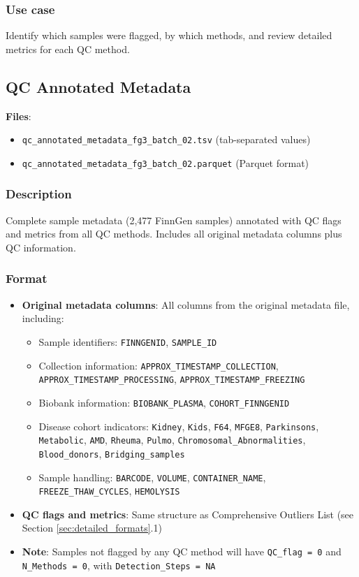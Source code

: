 \documentclass[11pt,a4paper]{article}
\begin{document}
\subsubsection{Use case}
Identify which samples were flagged, by which methods, and review detailed metrics for each QC method.

\subsection{QC Annotated Metadata}

\textbf{Files}:
\begin{itemize}
\item \texttt{qc\_annotated\_metadata\_fg3\_batch\_02.tsv} (tab-separated values)
\item \texttt{qc\_annotated\_metadata\_fg3\_batch\_02.parquet} (Parquet format)
\end{itemize}

\subsubsection{Description}
Complete sample metadata (2,477 FinnGen samples) annotated with QC flags and metrics from all QC methods. Includes all original metadata columns plus QC information.

\subsubsection{Format}
\begin{itemize}
\item \textbf{Original metadata columns}: All columns from the original metadata file, including:
  \begin{itemize}
    \item Sample identifiers: \texttt{FINNGENID}, \texttt{SAMPLE\_ID}
    \item Collection information: \texttt{APPROX\_TIMESTAMP\_COLLECTION}, \texttt{APPROX\_TIMESTAMP\_PROCESSING}, \texttt{APPROX\_TIMESTAMP\_FREEZING}
    \item Biobank information: \texttt{BIOBANK\_PLASMA}, \texttt{COHORT\_FINNGENID}
    \item Disease cohort indicators: \texttt{Kidney}, \texttt{Kids}, \texttt{F64}, \texttt{MFGE8}, \texttt{Parkinsons}, \texttt{Metabolic}, \texttt{AMD}, \texttt{Rheuma}, \texttt{Pulmo}, \texttt{Chromosomal\_Abnormalities}, \texttt{Blood\_donors}, \texttt{Bridging\_samples}
    \item Sample handling: \texttt{BARCODE}, \texttt{VOLUME}, \texttt{CONTAINER\_NAME}, \texttt{FREEZE\_THAW\_CYCLES}, \texttt{HEMOLYSIS}
  \end{itemize}
\item \textbf{QC flags and metrics}: Same structure as Comprehensive Outliers List (see Section \ref{sec:detailed_formats}.1)
\item \textbf{Note}: Samples not flagged by any QC method will have \texttt{QC\_flag = 0} and \texttt{N\_Methods = 0}, with \texttt{Detection\_Steps = NA}
\end{itemize}
\end{document}
